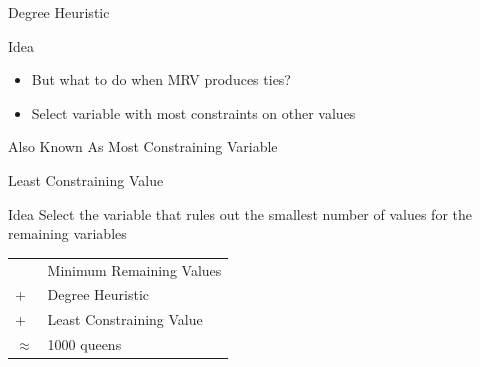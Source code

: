 \documentclass[12pt]{beamer}
\begin{document}
\begin{frame}{Degree Heuristic}
	\begin{block}{Idea}
		\begin{itemize}
			\item But what to do when MRV produces ties?
			\item Select variable with most constraints on other values
		\end{itemize}
	\end{block}
	\pause
	\begin{center}
	\end{center}
	\pause
	\begin{block}{Also Known As}
		Most Constraining Variable
	\end{block}
\end{frame}
\begin{frame}{Least Constraining Value}
	\begin{block}{Idea}
		Select the variable that rules out the smallest
		number of values for the remaining variables
	\end{block}
	\pause
	\begin{center}
	\end{center}
	\pause
	\begin{tabular}{ll}
		          & Minimum Remaining Values \\
		+         & Degree Heuristic \\
		+         & Least Constraining Value \\
		\hline
		$\approx$ & 1000 queens
	\end{tabular}
\end{frame}
\end{document}
